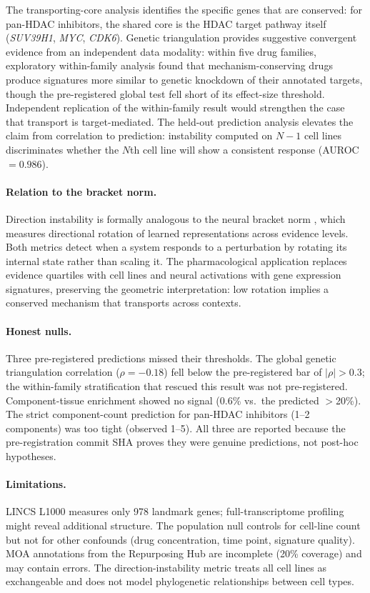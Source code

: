 \documentclass{article}
\begin{document}
The transporting-core analysis identifies the specific genes that
are conserved: for pan-HDAC inhibitors, the shared core is the HDAC
target pathway itself (\emph{SUV39H1}, \emph{MYC}, \emph{CDK6}).
Genetic triangulation provides suggestive convergent evidence from an
independent data modality: within five drug families, exploratory
within-family analysis found that mechanism-conserving drugs produce
signatures more similar to genetic knockdown of their annotated targets,
though the pre-registered global test fell short of its effect-size
threshold. Independent replication of the within-family result would
strengthen the case that transport is target-mediated. The held-out
prediction analysis elevates the claim from correlation to prediction:
instability computed on $N{-}1$ cell lines discriminates whether the
$N$th cell line will show a consistent response (AUROC $= 0.986$).

\paragraph{Relation to the bracket norm.}
Direction instability is formally analogous to the neural bracket norm
\citep{tower2026bracket}, which measures directional rotation of
learned representations across evidence levels. Both metrics detect when a
system responds to a perturbation by rotating its internal state rather
than scaling it. The pharmacological application replaces evidence
quartiles with cell lines and neural activations with gene expression
signatures, preserving the geometric interpretation: low rotation implies
a conserved mechanism that transports across contexts.

\paragraph{Honest nulls.}
Three pre-registered predictions missed their thresholds. The global
genetic triangulation correlation ($\rho = -0.18$) fell below the
pre-registered bar of $|\rho| > 0.3$; the within-family stratification
that rescued this result was not pre-registered. Component-tissue
enrichment showed no signal (0.6\% vs.\ the predicted $>$20\%). The
strict component-count prediction for pan-HDAC inhibitors (1--2
components) was too tight (observed 1--5). All three are reported
because the pre-registration commit SHA proves they were genuine
predictions, not post-hoc hypotheses.

\paragraph{Limitations.}
LINCS L1000 measures only 978 landmark genes; full-transcriptome profiling
might reveal additional structure. The population null controls for
cell-line count but not for other confounds (drug concentration, time point,
signature quality). MOA annotations from the Repurposing Hub are incomplete
(20\% coverage) and may contain errors. The direction-instability metric
treats all cell lines as exchangeable and does not model phylogenetic
relationships between cell types.
\end{document}
